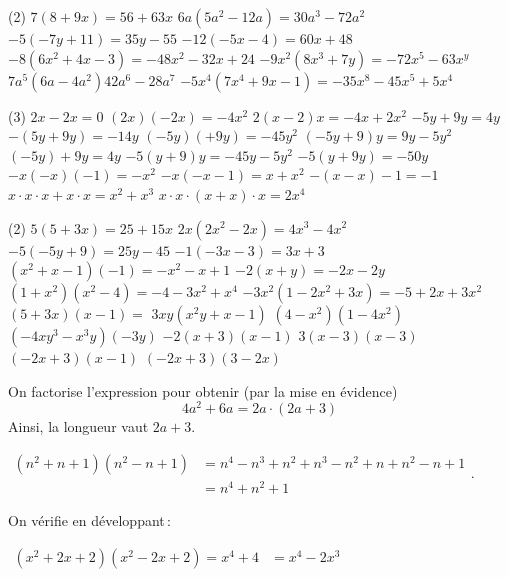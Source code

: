 \documentclass[a4paper,12pt]{report}
\begin{document}
\vspace*{-2\baselineskip}
\begin{core}
	\phantom{}
\begin{tasks}(2)
\task $7(8+9 x)=56+63x$
\task $6 a\left(5 a^2-12 a\right)=30a^3-72a^2$
\task $-5(-7 y+11)=35y-55$
\task $-12(-5 x-4)=60x+48$
\task $-8\left(6 x^2+4 x-3\right)=-48x^2-32x+24$
\task $-9 x^2\left(8 x^3+7 y\right)=-72x^5-63x^y$
\task $7 a^5\left(6 a-4 a^2\right)42a^6-28a^7$
\task $-5 x^4\left(7 x^4+9 x-1\right)=-35x^8-45x^5+5x^4$
\end{tasks}
\end{core}
\begin{core}
	\phantom{}
\begin{tasks}(3)
\task $2 x-2 x=0$
\task $(2 x)(-2 x)=-4x^2$
\task $2(x-2) x=-4x+2x^2$
\task $-5 y+9 y=4y$
\task $-(5 y+9 y)=-14y$
\task $(-5 y)(+9 y)=-45y^2$
\task $(-5 y+9) y=9y-5y^2$
\task $(-5 y)+9 y=4y$
\task $-5(y+9) y=-45y-5y^2$
\task $-5(y+9 y)=-50y$
\task $-x(-x)(-1)=-x^2$
\task $-x(-x-1)=x+x^2$
\task $-(x-x)-1=-1$
\task $x \cdot x \cdot x+x \cdot x=x^2+x^3$
\task $x \cdot x \cdot(x+x) \cdot x=2x^4$
\end{tasks}
\end{core}
\begin{core}
	\phantom{}
\begin{tasks}(2)
\task $5(5+3 x)=25+15x$
\task $2 x\left(2 x^2-2 x\right)=4x^3-4x^2$
\task $-5(-5 y+9)=25y-45$
\task $-1(-3 x-3)=3x+3$
\task $\left(x^2+x-1\right)(-1)=-x^2-x+1$
\task $-2(x+y)=-2x-2y$
\task $\left(1+x^2\right)\left(x^2-4\right)=-4-3x^2+x^4$
\task $-3 x^2\left(1-2 x^2+3 x\right)=-5+2x+3x^2$
\task $(5+3 x)(x-1)=$
\task $3 x y\left(x^2 y+x-1\right)$
\task $\left(4-x^2\right)\left(1-4 x^2\right)$
\task $\left(-4 x y^3-x^3 y\right)(-3 y)$
\task $-2(x+3)(x-1)$
\task $3(x-3)(x-3)$
\task $(-2 x+3)(x-1)$
\task $(-2 x+3)(3-2 x)$
\end{tasks}
\end{core}
\begin{core}
\phantom{}
On factorise l'expression pour obtenir (par la mise en évidence) 
\[4a^2+6a=2a\cdot (2a+3)\]
Ainsi, la longueur vaut $2a+3$.
\end{core}
\begin{core}
	\phantom{}

	$\begin{aligned}\left(n^2+n+1\right)\left(n^2-n+1\right)&=n^4-n^3+n^2+n^3-n^2+n+n^2-n+1\\
		&=n^4+n^2+1
	\end{aligned}$. 
\end{core}
\begin{core}
	On vérifie en développant\,:

	$\begin{aligned}\left(x^2+2 x+2\right)\left(x^2-2 x+2\right)=x^4+4&=x^4-2x^3\\
	\end{aligned}$
\end{core}
\end{document}
